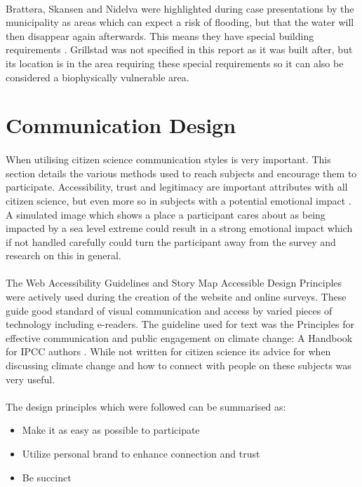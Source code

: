\paragraph{}
Brattøra, Skansen and Nidelva were highlighted during case presentations by the municipality as areas which can expect a risk of flooding, but that the water will then disappear again afterwards. This means they have special building requirements \cite{hanssen_saksframlegg_2013}. Grillstad was not specified in this report as it was built after, but its location is in the area requiring these special requirements so it can also be considered a biophysically vulnerable area.  

\section{Communication Design}
\paragraph{}
When utilising citizen science communication styles is very important. This section details the various methods used to reach subjects and encourage them to participate. Accessibility, trust and legitimacy are important attributes with all citizen science, but even more so in subjects with a potential emotional impact \cite{tweddle_guide_2012}. A simulated image which shows a place a participant cares about as being impacted by a sea level extreme could result in a strong emotional impact which if not handled carefully could turn the participant away from the survey and research on this in general.
\paragraph{}
The Web Accessibility Guidelines \cite{henry_web_2022} and Story Map Accessible Design Principles \cite{todd_liz_getting_nodate} were actively used during the creation of the website and online surveys. These guide good standard of visual communication and access by varied pieces of technology including e-readers. The guideline used for text  was the Principles for effective communication and public engagement on	climate change: A Handbook for IPCC authors \cite{corner_a_principles_2018}. While not written for citizen science its advice for when discussing climate change and how to connect with people on these subjects was very useful. 
\paragraph{}
The design principles which were followed can be summarised as:
\begin{itemize}
    \item Make it as easy as possible to participate
    \item Utilize personal brand to enhance connection and trust
    \item Be succinct
\end{itemize}
